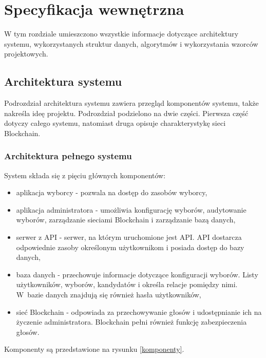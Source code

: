 \documentclass[a4paper,12pt]{book}
\begin{document}

\chapter{Specyfikacja wewnętrzna}

W tym rozdziale umieszczono wszystkie informacje dotyczące architektury systemu, wykorzystanych struktur danych, algorytmów i wykorzystania wzorców projektowych.
 
\section{Architektura systemu}
Podrozdział architektura systemu zawiera przegląd komponentów systemu, także nakreśla ideę projektu. Podrozdział podzielono na dwie części. Pierwsza część dotyczy całego systemu, natomiast druga opisuje charakterystykę sieci Blockchain.
 
\subsection{Architektura pełnego systemu}
 
System składa się z pięciu głównych komponentów:

\begin {itemize}
	\item aplikacja wyborcy - pozwala na dostęp do zasobów wyborcy,
	\item aplikacja administratora - umożliwia konfigurację wyborów, audytowanie wyborów, zarządzanie sieciami Blockchain i zarządzanie bazą danych,
	\item serwer z API - serwer, na którym uruchomione jest API. API dostarcza odpowiednie zasoby określonym użytkownikom i posiada dostęp do bazy danych,
	\item baza danych - przechowuje informacje dotyczące konfiguracji wyborów. Listy użytkowników, wyborów, kandydatów i określa relacje pomiędzy nimi. W~bazie danych znajdują się również hasła użytkowników,
	\item sieć Blockchain - odpowiada za przechowywanie głosów i udostępnianie ich na życzenie administratora. Blockchain pełni również funkcję zabezpieczenia głosów.
\end {itemize}

Komponenty są przedstawione na rysunku \ref{komponenty}.
\end{document}
